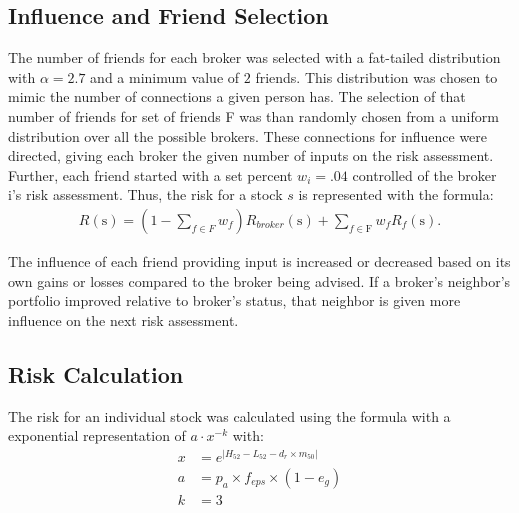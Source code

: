 \documentclass[letterpaper, 11 pt, proceedings]{IEEEtran}
\begin{document}
	\subsection{Influence and Friend Selection}\label{subsec:friends}
	The number of friends for each broker was selected with a fat-tailed distribution with $\alpha = 2.7$ and a minimum value of $2$ friends. This distribution was chosen to mimic the number of connections a given person has. The selection of that number of friends for set of friends F was than randomly chosen from a uniform distribution over all the possible brokers. These connections for influence were directed, giving each broker the given number of inputs on the risk assessment. Further, each friend started with a set percent $w_i = .04$ controlled of the broker i's risk assessment. Thus, the risk for a stock $s$ is represented with the formula:
	\begin{align}
		R(\text{s}) = (1-\sum\limits_{f\in F} w_f) R_{broker}(\text{s}) + \sum\limits_{f\in \text{F}} w_f R_f(\text{s}).\label{eq:weighted_assessment}
	\end{align}	
	
	The influence of each friend providing input is increased or decreased based on its own gains or losses compared to the broker being advised. If a broker's neighbor's portfolio improved relative to broker's status, that neighbor is given more influence on the next risk assessment.

	\subsection{Risk Calculation}\label{subsec:risk}
	The risk for an individual stock was calculated using the formula with a exponential representation of $a \cdot x^{-k}$ with:
	\begin{align}
		x &= e^{|H_{52} - L_{52} - d_r \times m_{50}|} \\
		a &= p_a \times f_{eps} \times (1 - e_g)\\
		k &= 3
	\end{align}

	
\end{document}
